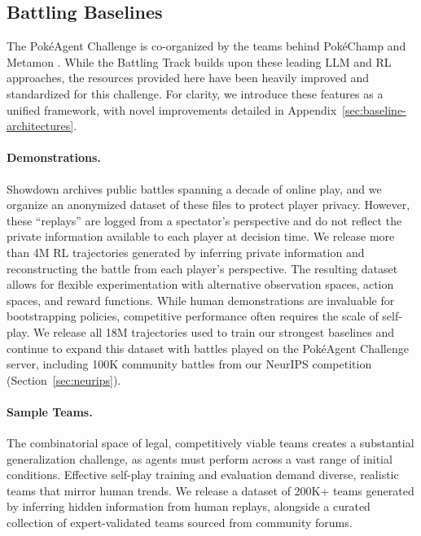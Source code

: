 \subsection{Battling Baselines}

The PokéAgent Challenge is co-organized by the teams behind PokéChamp \cite{karten2025pok} and Metamon \cite{grigsby2025human}. While the Battling Track builds upon these leading LLM and RL approaches, the resources provided here have been heavily improved and standardized for this challenge. For clarity, we introduce these features as a unified framework, with novel improvements detailed in Appendix~\ref{sec:baseline-architectures}.


\paragraph{Demonstrations.} Showdown archives public battles spanning a decade of online play, and we organize an anonymized dataset of these files to protect player privacy. However, these ``replays'' are logged from a spectator’s perspective and do not reflect the private information available to each player at decision time. We release more than 4M RL trajectories generated by inferring private information and reconstructing the battle from each player’s perspective. The resulting dataset allows for flexible experimentation with alternative observation spaces, action spaces, and reward functions. While human demonstrations are invaluable for bootstrapping policies, competitive performance often requires the scale of self-play. We release all 18M trajectories used to train our strongest baselines and continue to expand this dataset with battles played on the PokéAgent Challenge server, including 100K community battles from our NeurIPS competition (Section~\ref{sec:neurips}).

\vspace{-2mm}


\paragraph{Sample Teams.} The combinatorial space of legal, competitively viable teams creates a substantial generalization challenge, as agents must perform across a vast range of initial conditions. Effective self-play training and evaluation demand diverse, realistic teams that mirror human trends. We release a dataset of 200K+ teams generated by inferring hidden information from human replays, alongside a curated collection of expert-validated teams sourced from community forums.

